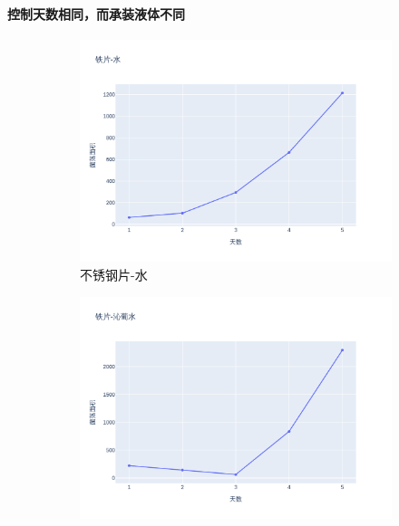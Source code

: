 \documentclass[12pt,a4paper]{ctexart}
\begin{document}
\paragraph{控制天数相同，而承装液体不同}
\begin{figure}[htbp]  %
    \centering  %
    \begin{subfigure}[b]{0.31\textwidth}  %
        \centering
        \includegraphics[width=\linewidth]{./plot/SingleMaterial/iron/铁片-水_line.png}  %
        \caption{不锈钢片-水}  %
        \label{subfig:1}     %
    \end{subfigure}
    \hfill  %
    \begin{subfigure}[b]{0.31\textwidth}
        \centering
        \includegraphics[width=\linewidth]{./plot/SingleMaterial/iron/铁片-沁葡水_line.png}

\end{subfigure}
\end{figure}
\end{document}
